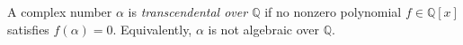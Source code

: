 
A complex number $\alpha$ is \emph{transcendental over $\mathbb Q$} if no nonzero polynomial $f\in\mathbb Q[x]$ satisfies $f(\alpha)=0$. Equivalently, $\alpha$ is not algebraic over $\mathbb Q$.
